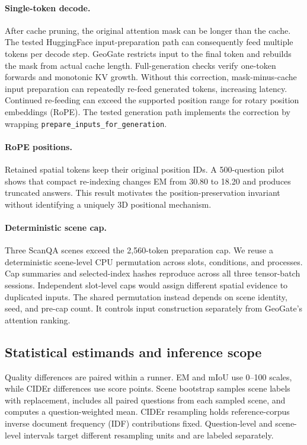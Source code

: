 \paragraph{Single-token decode.} After cache pruning, the original attention mask can be longer than the cache. The tested HuggingFace input-preparation path can consequently feed multiple tokens per decode step. GeoGate restricts input to the final token and rebuilds the mask from actual cache length. Full-generation checks verify one-token forwards and monotonic KV growth. Without this correction, mask-minus-cache input preparation can repeatedly re-feed generated tokens, increasing latency. Continued re-feeding can exceed the supported position range for rotary position embeddings (RoPE). The tested generation path implements the correction by wrapping \texttt{prepare\_inputs\_for\_generation}.

\paragraph{RoPE positions.} Retained spatial tokens keep their original position IDs. A 500-question pilot shows that compact re-indexing changes EM from 30.80 to 18.20 and produces truncated answers. This result motivates the position-preservation invariant without identifying a uniquely 3D positional mechanism.

\paragraph{Deterministic scene cap.} Three ScanQA scenes exceed the 2,560-token preparation cap. We reuse a deterministic scene-level CPU permutation across slots, conditions, and processes. Cap summaries and selected-index hashes reproduce across all three tensor-batch sessions. Independent slot-level caps would assign different spatial evidence to duplicated inputs. The shared permutation instead depends on scene identity, seed, and pre-cap count. It controls input construction separately from GeoGate's attention ranking.

\subsection{Statistical estimands and inference scope}
\label{sec:supp_statistics}

Quality differences are paired within a runner. EM and mIoU use 0--100 scales, while CIDEr differences use score points. Scene bootstrap samples scene labels with replacement, includes all paired questions from each sampled scene, and computes a question-weighted mean. CIDEr resampling holds reference-corpus inverse document frequency (IDF) contributions fixed. Question-level and scene-level intervals target different resampling units and are labeled separately.


